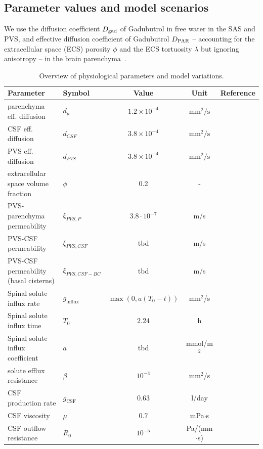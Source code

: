\documentclass[fleqn,10pt]{wlscirep}
\begin{document}
\subsection*{Parameter values and model scenarios}
We use the diffusion coefficient $D_{\rm gad}$ of Gadubutrol in free water in the SAS and PVS, and effective diffusion coefficient of Gadubutrol $D_{\rm PAR}$ -- accounting for the extracellular space (ECS) porosity $\phi$ and the ECS tortuosity $\lambda$ but ignoring anisotropy  -- in the brain parenchyma~\cite{hornkjol2022csf}. 
\begin{table}
  \begin{center}
    \begin{tabular}{ll|ccc}
      \toprule
      Parameter& Symbol & Value & Unit& Reference\\
      \midrule
         parenchyma eff. diffusion&  $d_p$&  $1.2 \times 10^{-4}$& $\text{mm}^2/\text{s}$  & \cite{valnes2020apparent}\\
         CSF eff. diffusion&  $d_{CSF}$&  $3.8 \times 10^{-4}$& $\text{mm}^2/\text{s}$ & \cite{valnes2020apparent}\\
         PVS eff. diffusion&  $d_{PVS}$&  $3.8 \times 10^{-4}$& $\text{mm}^2/\text{s}$ & \cite{valnes2020apparent}\\
         extracellular space volume fraction& $\phi$& 0.2& - &\cite{nicholson1981ion} \\
         PVS-parenchyma permeability&  $\xi_{PVS,P}$ & $3.8\cdot 10^{-7}$  & m/s & \cite{koch2023estimates} \\
         PVS-CSF permeability&  $\xi_{PVS,CSF}$& tbd & m/s & \\
        PVS-CSF permeability (basal cisterns)&  $\xi_{PVS,CSF-BC}$& tbd & m/s & \\ 
         \midrule
         Spinal solute influx rate & $g_{\mathrm{influx}}$ & $\max(0, a(T_0 - t))$  & mm$^2$/s & \cite{hornkjol2022csf} \\
         Spinal solute influx time & $T_0$ & $2.24$  & h & \cite{hornkjol2022csf} \\
         Spinal solute influx coefficient & $a$ & tbd  & mmol/m$^{2}$ & \cite{hornkjol2022csf} \\
         solute efflux resistance & $\beta$  & $10^{-4}$ & mm$^2$/s & \cite{hornkjol2022csf} \\
         \midrule
         CSF production rate & $g_{\mathrm{CSF}}$ & $0.63$  & l/day & \cite{nilsson1992circadian} \\
         CSF viscosity & $\mu$ & $0.7$  & mPa$ \cdot $s & \cite{bloomfield1998effects} \\ 
        CSF outflow resistance & $R_0$ & $10^{-5}$  & Pa/(mm$\cdot$s) & \cite{hornkjol2022csf} \\ 
        \bottomrule
    \end{tabular}
  \end{center}
  \caption{Overview of physiological parameters and model variations. 
  }
  \label{tab:overview}
\end{table}
\end{document}

